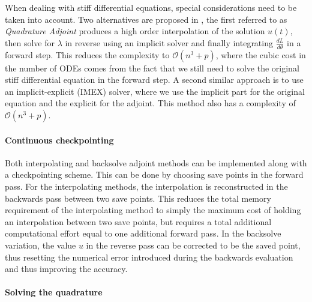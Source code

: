 When dealing with stiff differential equations, special considerations need to be taken into account.
Two alternatives are proposed in \cite{kim_stiff_2021}, the first referred to as \textit{Quadrature Adjoint} produces a high order interpolation of the solution $u(t)$, then solve for $\lambda$ in reverse using an implicit solver and finally integrating $\frac{dL}{d\theta}$ in a forward step.
This reduces the complexity to $\mathcal O (n^3 + p)$, where the cubic cost in the number of ODEs comes from the fact that we still need to solve the original stiff differential equation in the forward step. 
A second similar approach is to use an implicit-explicit (IMEX) solver, where we use the implicit part for the original equation and the explicit for the adjoint. 
This method also has a complexity of $\mathcal O (n^3 + p)$. 

\paragraph{Continuous checkpointing}
\label{section:checkpointint-cont}

Both interpolating and backsolve adjoint methods can be implemented along with a checkpointing scheme. 
This can be done by choosing save points in the forward pass. 
For the interpolating methods, the interpolation is reconstructed in the backwards pass between two save points. 
This reduces the total memory requirement of the interpolating method to simply the maximum cost of holding an interpolation between two save points, but requires a total additional computational effort equal to one additional forward pass. 
In the backsolve variation, the value $u$ in the reverse pass can be corrected to be the saved point, thus resetting the numerical error introduced during the backwards evaluation and thus improving the accuracy.

\paragraph{Solving the quadrature}


